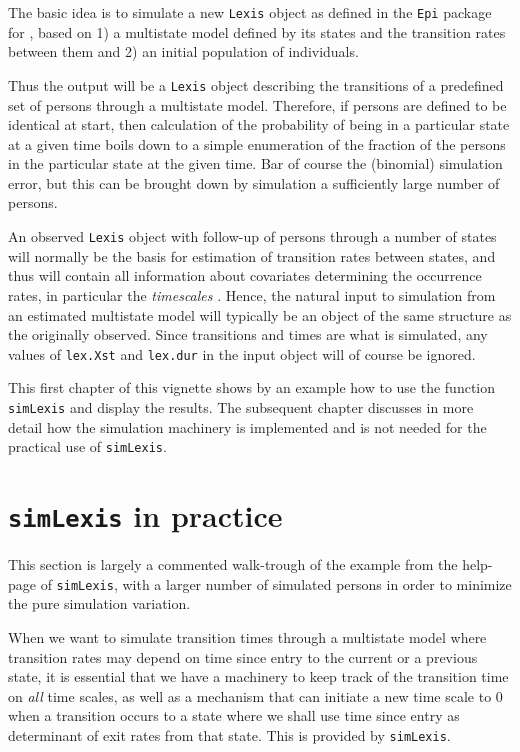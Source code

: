 \documentclass[a4paper,twoside,12pt]{report}
\begin{document}
The basic idea is to simulate a new \texttt{Lexis} object
\cite{Plummer.2011,Carstensen.2011a} as defined in the \texttt{Epi}
package for \R, based on 1) a multistate model defined by its states
and the transition rates between them and 2) an initial population of
individuals.

Thus the output will be a \texttt{Lexis} object describing the
transitions of a predefined set of persons through a multistate
model. Therefore, if persons are defined to be identical at start,
then calculation of the probability of being in a particular state at
a given time boils down to a simple enumeration of the fraction of the
persons in the particular state at the given time. Bar of course the
(binomial) simulation error, but this can be brought down by
simulation a sufficiently large number of persons.

An observed \texttt{Lexis} object with follow-up of persons through a
number of states will normally be the basis for estimation of
transition rates between states, and thus will contain all information
about covariates determining the occurrence rates, in particular the
\emph{timescales} \cite{Iacobelli.2013}. Hence, the natural input to
simulation from an estimated multistate model will typically be an
object of the same structure as the originally observed. Since
transitions and times are what is simulated, any values of
\texttt{lex.Xst} and \texttt{lex.dur} in the input object will of
course be ignored.

This first chapter of this vignette shows by an example how to use the
function \texttt{simLexis} and display the results. The subsequent
chapter discusses in more detail how the simulation machinery is
implemented and is not needed for the practical use of \texttt{simLexis}.

\section{\texttt{simLexis} in practice}

This section is largely a commented walk-trough of the example from
the help-page of \texttt{simLexis}, with a larger number of simulated
persons in order to minimize the pure simulation variation.

When we want to simulate transition times through a multistate model
where transition rates may depend on time since entry to the current
or a previous state, it is essential that we have a machinery to keep
track of the transition time on \emph{all} time scales, as well as a
mechanism that can initiate a new time scale to 0 when a transition
occurs to a state where we shall use time since entry as determinant
of exit rates from that state. This is provided by \texttt{simLexis}.
\end{document}
